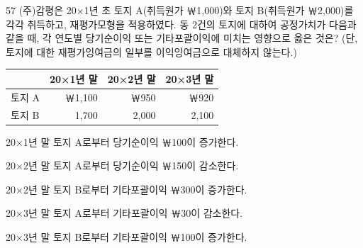 \begin{question}{57}
(주)감평은 20×1년 초 토지 A(취득원가 ￦1,000)와 토지 B(취득원가 ￦2,000)를 각각 취득하고, 재평가모형을 적용하였다. 동 2건의 토지에 대하여 공정가치가 다음과 같을 때, 각 연도별 당기순이익 또는 기타포괄이익에 미치는 영향으로 옳은 것은? (단, 토지에 대한 재평가잉여금의 일부를 이익잉여금으로 대체하지 않는다.)
\par{\small\centering\begin{tabular}{lrrr}\hline
 & \multicolumn{1}{c}{20×1년 말} & \multicolumn{1}{c}{20×2년 말} & \multicolumn{1}{c}{20×3년 말} \tabularnewline\hline
토지 A & ￦1,100 & ￦950 & ￦920 \tabularnewline
토지 B & 1,700 & 2,000 & 2,100 \tabularnewline\hline
\end{tabular}\par}
\begin{choices}
  \item 20×1년 말 토지 A로부터 당기순이익 ￦100이 증가한다.
  \item 20×2년 말 토지 A로부터 당기순이익 ￦150이 감소한다.
  \item 20×2년 말 토지 B로부터 기타포괄이익 ￦300이 증가한다.
  \item 20×3년 말 토지 A로부터 기타포괄이익 ￦30이 감소한다.
  \item 20×3년 말 토지 B로부터 기타포괄이익 ￦100이 증가한다.
\end{choices}
\end{question}
